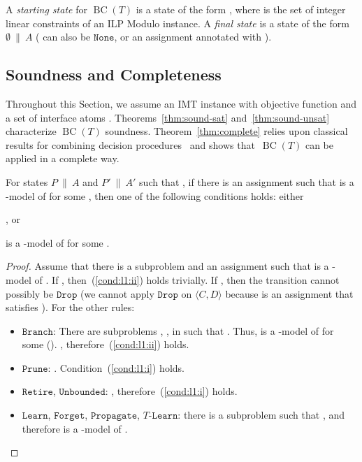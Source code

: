 \documentclass{llncs}
\newcommand\none[0]{\ensuremath{\mathtt{None}}}
\newcommand{\tr}[1]{\ensuremath{\mathtt{#1}}}
\newcommand{\ttr}[1]{\ensuremath{T\text{-}\mathtt{#1}}}
\newcommand{\state}[2]{\ensuremath{#1\ \|\ #2}}
\newcommand{\subp}[2]{\ensuremath{\langle#1, #2\rangle}}
\newcommand{\cd}{\subp{C}{D}}
\newcommand{\pa}{\state{P}{A}}
\newcommand{\paprime}{\state{P'}{A'}}
\newcommand{\bct}[0]{\ensuremath{\operatorname{BC}(T)}}
\begin{document}
A \emph{starting state} for \bct{} is a state of the form
, where  is the set of integer
linear constraints of an ILP Modulo  instance. A \emph{final state}
is a state of the form \state{\emptyset}{A} ( can also be \none{},
or an assignment annotated with ).

\subsection{Soundness and Completeness}
\label{subsec:soundness}

Throughout this Section, we assume an IMT instance with objective
function  and a set of interface atoms
. Theorems~\ref{thm:sound-sat} and~\ref{thm:sound-unsat}
characterize \bct{} soundness. Theorem~\ref{thm:complete} relies upon
classical results for combining decision
procedures~\cite{no79,noproof,combiningdp} and shows that~\bct{} can
be applied in a complete way.

\begin{lemma}
  \label{lemma:l1}
  For states \pa{} and \paprime{} such that , if
  there is an assignment  such that  is a -model of  for some , then one of the following
  conditions holds: either
  \begin{inparaenum}[(i)]
  \item\label{cond:l1:i} , or
  \item\label{cond:l1:ii}  is a -model of  for some .
  \end{inparaenum}
\end{lemma}
\begin{proof}
  Assume that there is a subproblem  and an assignment
   such that  is a -model of . If , then~(\ref{cond:l1:ii}) holds trivially. If , then
  the transition cannot possibly be \tr{Drop} (we cannot apply
  \tr{Drop} on {\cd} because  is an assignment that satisfies ). For the other rules:
  \begin{itemize}
  \item \tr{Branch}: There are subproblems , ,
     in  such that .  Thus,  is a -model of  for some  (). , therefore~(\ref{cond:l1:ii}) holds.
  \item \tr{Prune}: . Condition~(\ref{cond:l1:i}) holds.
  \item \tr{Retire}, \tr{Unbounded}: ,
    therefore~(\ref{cond:l1:i}) holds.
  \item \tr{Learn}, \tr{Forget}, \tr{Propagate}, \ttr{Learn}: there is
    a subproblem  such that , and therefore  is a -model of .
  \end{itemize}
\end{proof}
\end{document}
